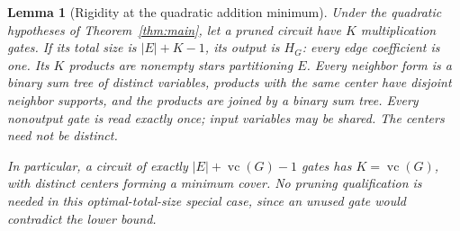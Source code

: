 \documentclass[11pt]{article}
\newcommand{\vc}{\operatorname{vc}}
\newtheorem{lemma}[theorem]{Lemma}
\theoremstyle{definition}
\theoremstyle{remark}
\begin{document}
\begin{lemma}[Rigidity at the quadratic addition minimum]\label{lem:quadoptimal}
Under the quadratic hypotheses of Theorem~\ref{thm:main}, let a pruned circuit have $K$ multiplication gates. If its total size is $|E|+K-1$, its output is $H_G$: every edge coefficient is one. Its $K$ products are nonempty stars partitioning $E$. Every neighbor form is a binary sum tree of distinct variables, products with the same center have disjoint neighbor supports, and the products are joined by a binary sum tree. Every nonoutput gate is read exactly once; input variables may be shared. The centers need not be distinct.

In particular, a circuit of exactly $|E|+\vc(G)-1$ gates has $K=\vc(G)$, with distinct centers forming a minimum cover. No pruning qualification is needed in this optimal-total-size special case, since an unused gate would contradict the lower bound.
\end{lemma}
\end{document}
